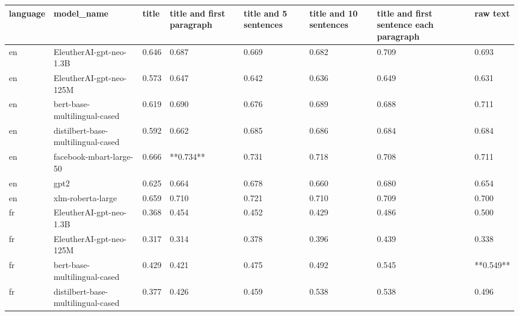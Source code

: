 \begin{tabular}{llllllll}
\toprule
language &                         model\_name & title & title and first paragraph & title and 5 sentences & title and 10 sentences & title and first sentence each paragraph &  raw text \\
\midrule
      en &            EleutherAI-gpt-neo-1.3B & 0.646 &                     0.687 &                 0.669 &                  0.682 &                                   0.709 &     0.693 \\
      en &            EleutherAI-gpt-neo-125M & 0.573 &                     0.647 &                 0.642 &                  0.636 &                                   0.649 &     0.631 \\
      en &       bert-base-multilingual-cased & 0.619 &                     0.690 &                 0.676 &                  0.689 &                                   0.688 &     0.711 \\
      en & distilbert-base-multilingual-cased & 0.592 &                     0.662 &                 0.685 &                  0.686 &                                   0.684 &     0.684 \\
      en &            facebook-mbart-large-50 & 0.666 &                 **0.734** &                 0.731 &                  0.718 &                                   0.708 &     0.711 \\
      en &                               gpt2 & 0.625 &                     0.664 &                 0.678 &                  0.660 &                                   0.680 &     0.654 \\
      en &                  xlm-roberta-large & 0.659 &                     0.710 &                 0.721 &                  0.710 &                                   0.709 &     0.700 \\
      fr &            EleutherAI-gpt-neo-1.3B & 0.368 &                     0.454 &                 0.452 &                  0.429 &                                   0.486 &     0.500 \\
      fr &            EleutherAI-gpt-neo-125M & 0.317 &                     0.314 &                 0.378 &                  0.396 &                                   0.439 &     0.338 \\
      fr &       bert-base-multilingual-cased & 0.429 &                     0.421 &                 0.475 &                  0.492 &                                   0.545 & **0.549** \\
      fr & distilbert-base-multilingual-cased & 0.377 &                     0.426 &                 0.459 &                  0.538 &                                   0.538 &     0.496 \\

\end{tabular}
